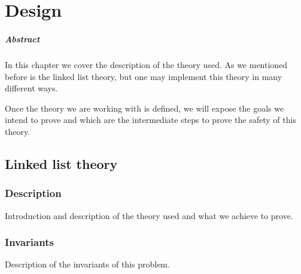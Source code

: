 \chapter{Design\label{chap:design}}

\paragraph{Abstract} In this chapter we cover the description of the theory used. As we mentioned before is the linked list theory, but one may implement this theory in many different ways. 

Once the theory we are working with is defined, we will expose the goals we intend to prove and which are the intermediate steps to prove the safety of this theory.

\section{Linked list theory}

\subsection{Description}

Introduction and description of the theory used and what we achieve to prove.

\subsection{Invariants}

Description of the invariants of this problem.
